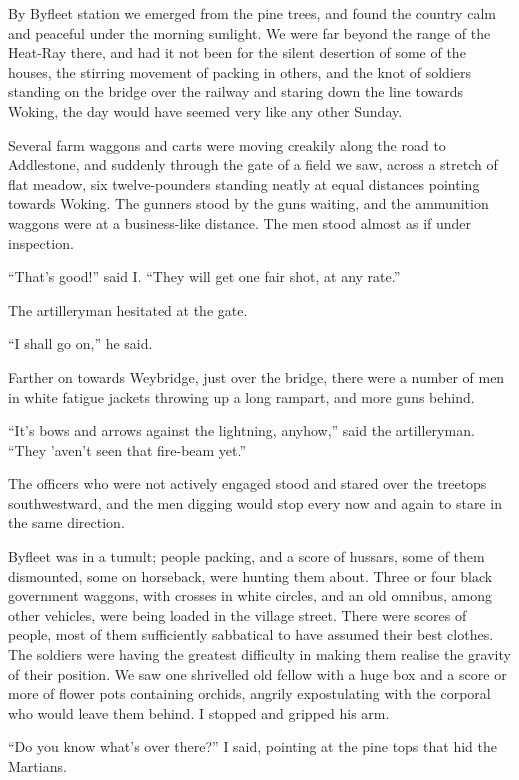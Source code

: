 By Byfleet station we emerged from the pine trees, and found the
country calm and peaceful under the morning sunlight. We were far
beyond the range of the Heat-Ray there, and had it not been for the
silent desertion of some of the houses, the stirring movement of
packing in others, and the knot of soldiers standing on the bridge
over the railway and staring down the line towards Woking, the day
would have seemed very like any other Sunday.

Several farm waggons and carts were moving creakily along the road
to Addlestone, and suddenly through the gate of a field we saw,
across a stretch of flat meadow, six twelve-pounders standing
neatly at equal distances pointing towards Woking. The gunners
stood by the guns waiting, and the ammunition waggons were at a
business-like distance. The men stood almost as if under
inspection.

``That's good!'' said I. ``They will get one fair shot, at any rate.''

The artilleryman hesitated at the gate.

``I shall go on,'' he said.

Farther on towards Weybridge, just over the bridge, there were a
number of men in white fatigue jackets throwing up a long rampart,
and more guns behind.

``It's bows and arrows against the lightning, anyhow,'' said the
artilleryman. ``They 'aven't seen that fire-beam yet.''

The officers who were not actively engaged stood and stared over
the treetops southwestward, and the men digging would stop every
now and again to stare in the same direction.

Byfleet was in a tumult; people packing, and a score of hussars,
some of them dismounted, some on horseback, were hunting them
about. Three or four black government waggons, with crosses in
white circles, and an old omnibus, among other vehicles, were being
loaded in the village street. There were scores of people, most of
them sufficiently sabbatical to have assumed their best clothes.
The soldiers were having the greatest difficulty in making them
realise the gravity of their position. We saw one shrivelled old
fellow with a huge box and a score or more of flower pots
containing orchids, angrily expostulating with the corporal who
would leave them behind. I stopped and gripped his arm.

``Do you know what's over there?'' I said, pointing at the pine tops
that hid the Martians.

